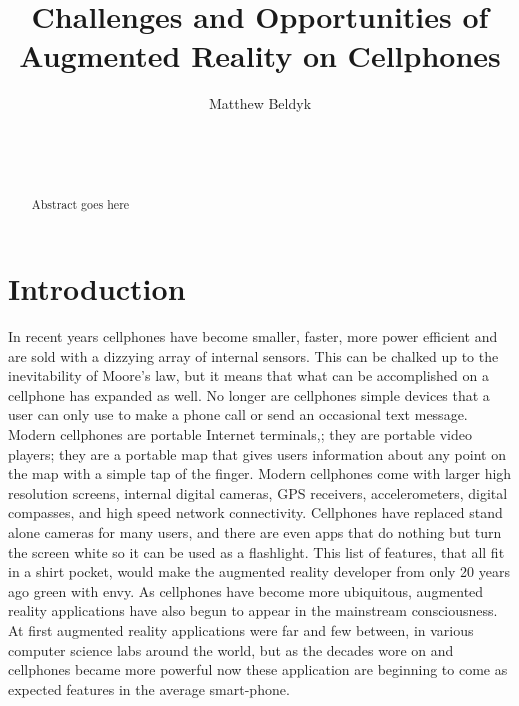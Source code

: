 \documentclass{acm_proc_article-sp}
\begin{document}
\title{Challenges and Opportunities of Augmented Reality on Cellphones}

%
\author{
\alignauthor
Matthew Beldyk\\
\\
\\
\\
}
\maketitle
\begin{abstract}
Abstract goes here
\end{abstract}

\section{Introduction}
In recent years cellphones have become smaller, faster, more power efficient and are sold with a dizzying array of internal sensors.  This can be chalked up to the inevitability of Moore's law, but it means that what can be accomplished on a cellphone has expanded as well.  No longer are cellphones simple devices that a user can only use to  make a phone call or send an occasional text message. Modern cellphones are portable Internet terminals,; they are portable video players; they are a portable map that gives users information about any point on the map with a simple tap of the finger.  Modern cellphones come with larger high resolution screens, internal digital cameras, GPS receivers, accelerometers, digital compasses, and high speed network connectivity. Cellphones have replaced stand alone cameras for many users, and there are even apps that do nothing but turn the screen white so it can be used as a flashlight. This list of features, that all fit in a shirt pocket, would make the augmented reality developer from only 20 years ago green with envy.  As cellphones have become more ubiquitous, augmented reality applications have also begun to appear in the mainstream consciousness.  At first augmented reality applications were far and few between, in various computer science labs around the world, but as the decades wore on and cellphones became more powerful now these application are beginning to come as expected features in the average smart-phone.  
\end{document}
